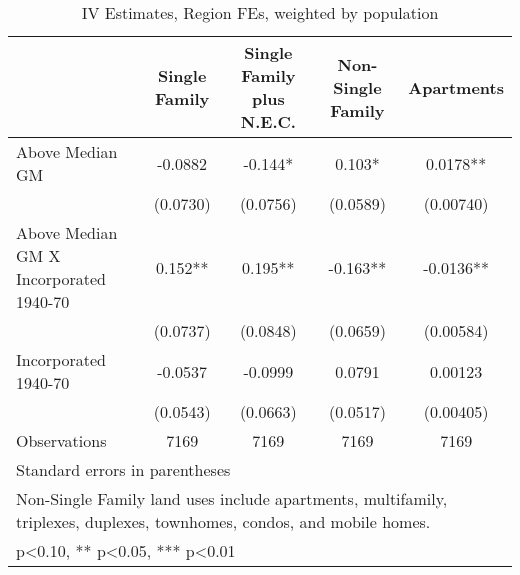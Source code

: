 \begin{table}[htbp]\centering
\def\sym#1{\ifmmode^{#1}\else\(^{#1}\)\fi}
\caption{IV Estimates, Region FEs, weighted by population}
\begin{tabular}{l*{4}{c}}
\toprule
                    &\multicolumn{1}{c}{Single Family}&\multicolumn{1}{c}{Single Family plus N.E.C.}&\multicolumn{1}{c}{Non-Single Family}&\multicolumn{1}{c}{Apartments}\\
\midrule
Above Median GM     &     -0.0882   &      -0.144*  &       0.103*  &      0.0178** \\
                    &    (0.0730)   &    (0.0756)   &    (0.0589)   &   (0.00740)   \\
\addlinespace
Above Median GM X Incorporated 1940-70&       0.152** &       0.195** &      -0.163** &     -0.0136** \\
                    &    (0.0737)   &    (0.0848)   &    (0.0659)   &   (0.00584)   \\
\addlinespace
Incorporated 1940-70&     -0.0537   &     -0.0999   &      0.0791   &     0.00123   \\
                    &    (0.0543)   &    (0.0663)   &    (0.0517)   &   (0.00405)   \\
\midrule
Observations        &        7169   &        7169   &        7169   &        7169   \\
\bottomrule
\multicolumn{5}{l}{\footnotesize Standard errors in parentheses}\\
\multicolumn{5}{l}{\footnotesize Non-Single Family land uses include apartments, multifamily, triplexes, duplexes, townhomes, condos, and mobile homes.}\\
\multicolumn{5}{l}{\footnotesize * p<0.10, ** p<0.05, *** p<0.01}\\
\end{tabular}
\end{table}
